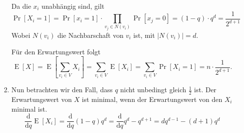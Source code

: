 \documentclass[a4paper]{scrartcl}
\DeclareMathOperator{\Pr}{Pr}
\DeclareMathOperator{\E}{E}
\begin{document}
\begin{enumerate}[label=\bfseries \arabic*.]
\begin{enumerate}
        Da die $x_i$ unabhängig sind, gilt
        \begin{equation*}
            \Pr[X_i = 1]
            = \Pr[x_i = 1] \cdot \prod_{v_j \in N(v_i)} \Pr[x_j = 0]
            = (1-q) \cdot q^d
            = \frac{1}{2^{d+1}}
        \end{equation*}
        Wobei $N(v_i)$ die Nachbarschaft von $v_i$ ist, mit $|N(v_i)| = d$.

        Für den Erwartungswert folgt
        \begin{equation*}
            \E[X]
            = \E\left[ \sum_{v_i \in V} X_i \right]
            = \sum_{v_i \in V} \E[X_i]
            = \sum_{v_i \in V} \Pr[X_i = 1]
            = n \cdot \frac{1}{2^{d+1}}.
        \end{equation*}

    \item
        Nun betrachten wir den Fall, dass $q$ nicht unbedingt gleich
        $\frac{1}{2}$ ist.
        Der Erwartungswert von $X$ ist minimal, wenn der Erwartungswert von den
        $X_i$ minimal ist.
        \begin{equation*}
            \frac{\mathrm{d}}{\mathrm{d}q} \E[X_i]
            = \frac{\mathrm{d}}{\mathrm{d}q} (1-q)q^d
            = \frac{\mathrm{d}}{\mathrm{d}q} q^d - q^{d+1}
            = dq^{d-1} -(d+1)q^d
        \end{equation*}


\end{enumerate}
\end{enumerate}
\end{document}
